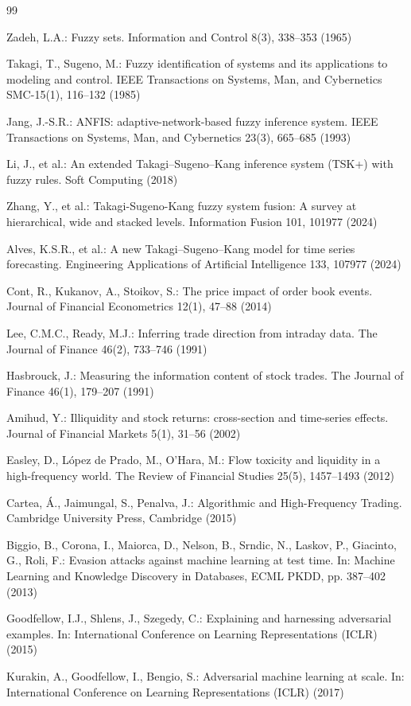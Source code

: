 \documentclass[pdflatex,sn-mathphys-num]{sn-jnl}
\theoremstyle{thmstyleone}
\theoremstyle{thmstyletwo}
\theoremstyle{thmstylethree}
\begin{document}
\begin{thebibliography}{99}

 Zadeh, L.A.: Fuzzy sets. Information and Control 8(3), 338--353 (1965)

 Takagi, T., Sugeno, M.: Fuzzy identification of systems and its applications to modeling and control. IEEE Transactions on Systems, Man, and Cybernetics SMC-15(1), 116--132 (1985)

 Jang, J.-S.R.: ANFIS: adaptive-network-based fuzzy inference system. IEEE Transactions on Systems, Man, and Cybernetics 23(3), 665--685 (1993)

 Li, J., et al.: An extended Takagi--Sugeno--Kang inference system (TSK+) with fuzzy rules. Soft Computing (2018)

 Zhang, Y., et al.: Takagi-Sugeno-Kang fuzzy system fusion: A survey at hierarchical, wide and stacked levels. Information Fusion 101, 101977 (2024)

 Alves, K.S.R., et al.: A new Takagi--Sugeno--Kang model for time series forecasting. Engineering Applications of Artificial Intelligence 133, 107977 (2024)

 Cont, R., Kukanov, A., Stoikov, S.: The price impact of order book events. Journal of Financial Econometrics 12(1), 47--88 (2014)

 Lee, C.M.C., Ready, M.J.: Inferring trade direction from intraday data. The Journal of Finance 46(2), 733--746 (1991)

 Hasbrouck, J.: Measuring the information content of stock trades. The Journal of Finance 46(1), 179--207 (1991)

 Amihud, Y.: Illiquidity and stock returns: cross-section and time-series effects. Journal of Financial Markets 5(1), 31--56 (2002)

 Easley, D., L\'opez de Prado, M., O'Hara, M.: Flow toxicity and liquidity in a high-frequency world. The Review of Financial Studies 25(5), 1457--1493 (2012)

 Cartea, \'A., Jaimungal, S., Penalva, J.: Algorithmic and High-Frequency Trading. Cambridge University Press, Cambridge (2015)

 Biggio, B., Corona, I., Maiorca, D., Nelson, B., Srndic, N., Laskov, P., Giacinto, G., Roli, F.: Evasion attacks against machine learning at test time. In: Machine Learning and Knowledge Discovery in Databases, ECML PKDD, pp. 387--402 (2013)

 Goodfellow, I.J., Shlens, J., Szegedy, C.: Explaining and harnessing adversarial examples. In: International Conference on Learning Representations (ICLR) (2015)

 Kurakin, A., Goodfellow, I., Bengio, S.: Adversarial machine learning at scale. In: International Conference on Learning Representations (ICLR) (2017)

\end{thebibliography}
\end{document}
